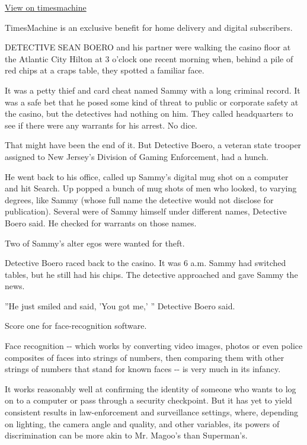 \href{http://timesmachine.nytimes3xbfgragh.onion/timesmachine/2001/05/03/131512.html}{View
on timesmachine}

TimesMachine is an exclusive benefit for home delivery and digital
subscribers.

DETECTIVE SEAN BOERO and his partner were walking the casino floor at
the Atlantic City Hilton at 3 o'clock one recent morning when, behind a
pile of red chips at a craps table, they spotted a familiar face.

It was a petty thief and card cheat named Sammy with a long criminal
record. It was a safe bet that he posed some kind of threat to public or
corporate safety at the casino, but the detectives had nothing on him.
They called headquarters to see if there were any warrants for his
arrest. No dice.

That might have been the end of it. But Detective Boero, a veteran state
trooper assigned to New Jersey's Division of Gaming Enforcement, had a
hunch.

He went back to his office, called up Sammy's digital mug shot on a
computer and hit Search. Up popped a bunch of mug shots of men who
looked, to varying degrees, like Sammy (whose full name the detective
would not disclose for publication). Several were of Sammy himself under
different names, Detective Boero said. He checked for warrants on those
names.

Two of Sammy's alter egos were wanted for theft.

Detective Boero raced back to the casino. It was 6 a.m. Sammy had
switched tables, but he still had his chips. The detective approached
and gave Sammy the news.

''He just smiled and said, 'You got me,' '' Detective Boero said.

Score one for face-recognition software.

Face recognition -\/- which works by converting video images, photos or
even police composites of faces into strings of numbers, then comparing
them with other strings of numbers that stand for known faces -\/- is
very much in its infancy.

It works reasonably well at confirming the identity of someone who wants
to log on to a computer or pass through a security checkpoint. But it
has yet to yield consistent results in law-enforcement and surveillance
settings, where, depending on lighting, the camera angle and quality,
and other variables, its powers of discrimination can be more akin to
Mr. Magoo's than Superman's.

